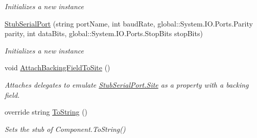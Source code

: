\begin{DoxyCompactItemize}
\begin{DoxyCompactList}\small\item\em Initializes a new instance\end{DoxyCompactList}\item 
\hyperlink{class_system_1_1_i_o_1_1_ports_1_1_fakes_1_1_stub_serial_port_add2978635b1d21da591743b22330069b}{Stub\-Serial\-Port} (string port\-Name, int baud\-Rate, global\-::\-System.\-I\-O.\-Ports.\-Parity parity, int data\-Bits, global\-::\-System.\-I\-O.\-Ports.\-Stop\-Bits stop\-Bits)
\begin{DoxyCompactList}\small\item\em Initializes a new instance\end{DoxyCompactList}\item 
void \hyperlink{class_system_1_1_i_o_1_1_ports_1_1_fakes_1_1_stub_serial_port_ae5c05b6b7f5b7fdcf762d7e128c7c101}{Attach\-Backing\-Field\-To\-Site} ()
\begin{DoxyCompactList}\small\item\em Attaches delegates to emulate \hyperlink{class_system_1_1_i_o_1_1_ports_1_1_fakes_1_1_stub_serial_port_af6d38ab4eb141a7951e40d3d9ac03156}{Stub\-Serial\-Port.\-Site} as a property with a backing field.\end{DoxyCompactList}\item 
override string \hyperlink{class_system_1_1_i_o_1_1_ports_1_1_fakes_1_1_stub_serial_port_af7de80a84f24529e388cfcebe44fb69e}{To\-String} ()
\begin{DoxyCompactList}\small\item\em Sets the stub of Component.\-To\-String()\end{DoxyCompactList}\end{DoxyCompactItemize}
